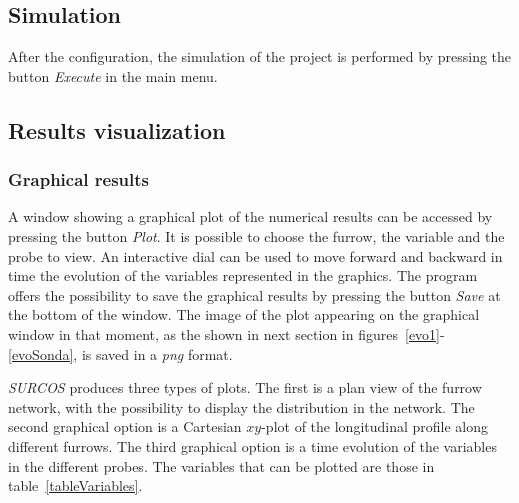 \documentclass[review,authoryear]{elsarticle}
\begin{document}
\subsection{Simulation}

After the configuration, the simulation of the project is performed by pressing
the button \emph{Execute} in the main menu.

\subsection{Results visualization}

\subsubsection{Graphical results}

A window showing a graphical plot of the numerical results can be accessed by
pressing the button \emph{Plot}.
It is possible to choose the furrow, the variable and the probe to view.
An interactive dial can be used to move forward and backward in time the
evolution of the variables represented in the graphics.
The program offers the possibility
to save the graphical results by pressing the button \emph{Save} at the bottom
of the window. The image of the plot appearing on the graphical window in that
moment, as the shown in next section in figures~\ref{evo1}-\ref{evoSonda}, is
saved in a \emph{png} format.


\emph{SURCOS} produces three types of plots. The first is a plan view of
the furrow network, with the possibility to display the distribution in the
network. The second graphical option is a Cartesian $xy$-plot of the
longitudinal profile along different furrows. The third graphical option is a
time evolution of the variables in the different probes. The variables that can
be plotted are those in table~\ref{tableVariables}.
\end{document}
